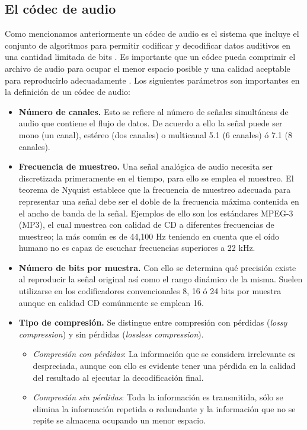 \subsection{El códec de audio}
Como mencionamos anteriormente un códec de audio es el sistema que incluye el conjunto de algoritmos para permitir codificar y decodificar datos auditivos en una cantidad limitada de bits \cite[]{Bosi2003,Painter2000}. Es importante que un códec pueda comprimir el archivo de audio para ocupar el menor espacio posible y una calidad aceptable para reproducirlo adecuadamente \cite[]{Painter2000}. Los siguientes parámetros son importantes en la definición de un códec de audio:
\begin{itemize}
	\item\textbf{Número de canales.} Esto se refiere al número de señales simultáneas de audio que contiene el flujo de datos. De acuerdo a ello la señal puede ser mono (un canal), estéreo (dos canales) o multicanal 5.1 (6 canales) ó 7.1 (8 canales).
	\item\textbf{Frecuencia de muestreo.} Una señal analógica de audio necesita ser discretizada primeramente en el tiempo, para ello se emplea el muestreo. El teorema de Nyquist establece que la frecuencia de muestreo adecuada para representar una señal debe ser el doble de la frecuencia máxima contenida en el ancho de banda de la señal. Ejemplos de ello son los estándares MPEG-3 (MP3), el cual muestrea con calidad de CD a diferentes frecuencias de muestreo; la más común es de 44,100 Hz teniendo en cuenta que el oído humano no es capaz de escuchar frecuencias superiores a 22 kHz.
	\item\textbf{Número de bits por muestra.} Con ello se determina qué precisión existe al reproducir la señal original así como el rango dinámico de la misma. Suelen utilizarse en los codificadores convencionales 8, 16 ó 24 bits por muestra aunque en calidad CD comúnmente se emplean 16. 
	\item\textbf{Tipo de compresión.} Se distingue entre compresión con pérdidas (\emph{lossy compression}) y sin pérdidas (\emph{lossless compression}).
		\begin{itemize}
		\item \emph{Compresión con pérdidas}: La información que se considera irrelevante es despreciada, aunque con ello es evidente 					tener una pérdida en la calidad del resultado al ejecutar la decodificación final.		
		\item \emph{Compresión sin pérdidas}: Toda la información es transmitida, sólo se elimina la información repetida o redundante y la 								información que no se repite se almacena ocupando un menor espacio.
		\end{itemize}
		

\end{itemize}
